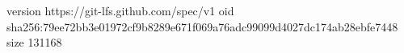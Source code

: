 version https://git-lfs.github.com/spec/v1
oid sha256:79ee72bb3e01972cf9b8289e671f069a76adc99099d4027dc174ab28ebfe7448
size 131168
